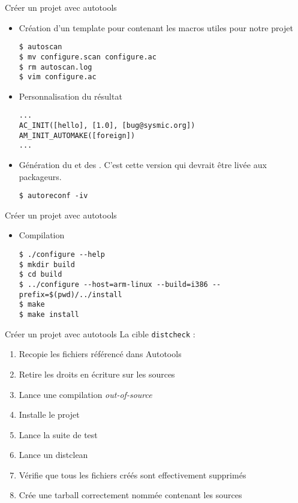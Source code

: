 \begin{frame}[fragile=singleslide]{Créer un projet avec autotools}
  \begin{itemize}
  \item  Création  d'un  template  pour   contenant  les
    macros utiles pour notre projet
\begin{lstlisting}
$ autoscan
$ mv configure.scan configure.ac
$ rm autoscan.log
$ vim configure.ac
\end{lstlisting}
  \item Personnalisation du résultat
\begin{lstlisting}
...
AC_INIT([hello], [1.0], [bug@sysmic.org])
AM_INIT_AUTOMAKE([foreign])
...
\end{lstlisting}
  \item      Génération      du            et      des
    . C'est cette version qui devrait être livée aux
    packageurs.
\begin{lstlisting}
$ autoreconf -iv
\end{lstlisting} %
  \end{itemize}
\end{frame}

\begin{frame}[fragile=singleslide]{Créer un projet avec autotools}
  \begin{itemize}
  \item Compilation
\begin{lstlisting}
$ ./configure --help
$ mkdir build
$ cd build
$ ../configure --host=arm-linux --build=i386 --prefix=$(pwd)/../install
$ make
$ make install
\end{lstlisting} %
  \end{itemize}
\end{frame}

\begin{frame}[fragile=singleslide]{Créer un projet avec autotools}
  La cible \verb+distcheck+ :
  \begin{enumerate}
  \item Recopie les fichiers référencé dans Autotools
  \item Retire les droits en écriture sur les sources
  \item Lance une compilation \emph{out-of-source}
  \item Installe le projet
  \item Lance la suite de test
  \item Lance un distclean
  \item Vérifie que tous les fichiers créés sont effectivement supprimés
  \item Crée une tarball correctement nommée contenant les sources
  \end{enumerate}
\end{frame}

